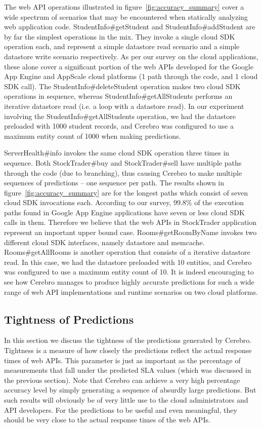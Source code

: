 The web API operations illustrated in figure~\ref{fig:accuracy_summary} cover a wide spectrum of scenarios that may be encountered
when statically analyzing web application code. StudentInfo\#getStudent and StudentInfo\#addStudent are by far the simplest
operations in the mix. They invoke a single cloud SDK operation each, and represent a simple datastore read scenario and a simple
datastore write scenario respectively. As per our survey on the cloud applications, these alone cover a significant portion of the 
web APIs developed for the Google App Engine and AppScale cloud platforms (1 path through the code, and 1 cloud SDK call). 
The StudentInfo\#deleteStudent operation makes two cloud SDK operations in sequence, whereas
StudentInfo\#getAllStudents performs an iterative datastore read (i.e. a loop with a datastore read).
In our experiment involving the StudentInfo\#getAllStudents operation, we had the datastore preloaded with 1000 student records, 
and Cerebro was configured to use a maximum entity count of 1000 when making predictions.

ServerHealth\#info invokes the same cloud SDK operation three times in sequence. Both StockTrader\#buy and StockTrader\#sell have
multiple paths through the code (due to branching), thus causing Cerebro to make multiple sequences of predictions -- one sequence
per path. The results shown in figure~\ref{fig:accuracy_summary} are for the longest paths which consist of seven cloud SDK invocations each. According to
our survey, 99.8\% of the execution paths found in Google App Engine applications have seven or less cloud SDK calls in them. Therefore we believe
that the web APIs in StockTrader application represent an important upper bound case. Rooms\#getRoomByName
invokes two different cloud SDK interfaces, namely datastore and memcache. Rooms\#getAllRooms is another operation that consists of
a iterative datastore read. In this case, we had the datastore preloaded with 10 entities, and Cerebro was configured to use a maximum entity
count of 10. It is indeed encouraging to see how Cerebro manages to produce highly accurate predictions for such a wide range 
of web API implementations and runtime scenarios on two cloud platforms.

\subsection{Tightness of Predictions}
In this section we discuss the tightness of the predictions generated by Cerebro. Tightness is a measure of how closely the predictions
reflect the actual response times of web APIs. This parameter is just as important as the percentage of measurements that fall under
the predicted SLA values (which 
was discussed in the previous section). Note that Cerebro can achieve a very high percentage accuracy level by simply generating a 
sequence of absurdly large predictions. But such results will obviously be of very little use to the cloud administrators and API
developers. For the predictions to be useful and even meaningful, they should be very close to the actual response times of the web APIs.

